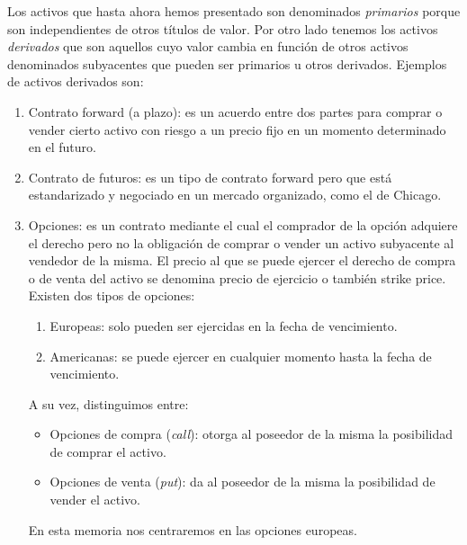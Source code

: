 Los activos que hasta ahora hemos presentado son denominados \textit{primarios} porque son independientes de otros títulos de valor. Por otro lado tenemos los activos \textit{derivados} que son aquellos cuyo valor cambia en función de otros activos denominados subyacentes que pueden ser primarios u otros derivados. Ejemplos de activos derivados son:
\begin{enumerate}
	\item Contrato forward (a plazo): es un acuerdo entre dos partes para comprar o vender cierto activo con riesgo a un precio fijo en un momento determinado en el futuro. 
	\item Contrato de futuros: es un tipo de contrato forward pero que está estandarizado y negociado en un mercado organizado, como el de Chicago.
	\item Opciones: es un contrato mediante el cual el comprador de la opción adquiere el derecho pero no la obligación de comprar o vender un activo subyacente al vendedor de la misma. El precio al que se puede ejercer el derecho de compra o de venta del activo se denomina precio de ejercicio o también strike price. Existen dos tipos de opciones: 
	\begin{enumerate}
		\item Europeas: solo pueden ser ejercidas en la fecha de vencimiento.
		\item Americanas:  se puede ejercer en cualquier momento hasta la fecha de vencimiento.
	\end{enumerate}
	A su vez, distinguimos entre:
	\begin{itemize}
		\item Opciones de compra (\textit{call}): otorga al poseedor de la misma la posibilidad de comprar el activo.
		\item Opciones de venta (\textit{put}): da al poseedor de la misma la posibilidad de vender el activo.
	\end{itemize}
	
	En esta memoria nos centraremos en las opciones europeas. 
\end{enumerate} 

